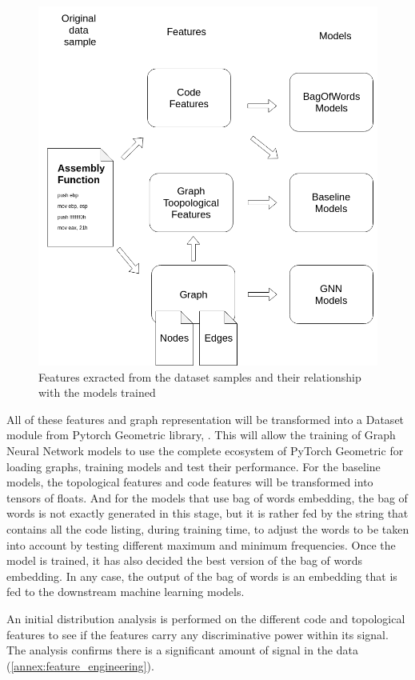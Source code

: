 \begin{figure}[H]
    \centering
        \includegraphics[width=0.55\linewidth]{img/Features_and_models_diagram.png}
    \caption{Features exracted from the dataset samples and their relationship with the models trained}\label{fig:Features_diagram}
\end{figure}

All of these features and graph representation will be transformed into a Dataset module from Pytorch Geometric library, \cite{fey2019fast}. This will allow the training of Graph Neural Network models to use the complete ecosystem of PyTorch Geometric for loading graphs, training models and test their performance. For the baseline models, the topological features and code features will be transformed into tensors of floats. And for the models that use bag of words embedding, the bag of words is not exactly generated in this stage, but it is rather fed by the string that contains all the code listing, during training time, to adjust the words to be taken into account by testing different maximum and minimum frequencies. Once the model is trained, it has also decided the best version of the bag of words embedding. In any case, the output of the bag of words is an embedding that is fed to the downstream machine learning models.

An initial distribution analysis is performed on the different code and topological features to see if the features carry any discriminative power within its signal. The analysis confirms there is a significant amount of signal in the data (\ref{annex:feature_engineering}).



